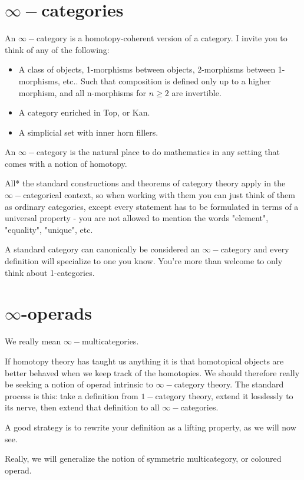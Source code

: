 \section{$\infty-$categories}
An $\infty-$category is a homotopy-coherent version of a category. I invite you to think of any of the following:
\begin{itemize}
    \item A class of objects, 1-morphisms between objects, 2-morphisms between 1-morphisms, etc.. Such that composition is defined only up to a higher morphism, and all n-morphisms for $n\geq 2$ are invertible.
    \item A category enriched in Top, or Kan.
    \item A simplicial set with inner horn fillers.
\end{itemize}

An $\infty-$category is the natural place to do mathematics in any setting that comes with a notion of homotopy.

All* the standard constructions and theorems of category theory apply in the $\infty-$categorical context, so when working with them you can just think of them as ordinary categories, except every statement has to be formulated in terms of a universal property - you are not allowed to mention the words "element", "equality", "unique", etc.

A standard category can canonically be considered an $\infty-$category and every definition will specialize to one you know. You're more than welcome to only think about 1-categories.


\section{$\infty$-operads}
We really mean $\infty-$multicategories.

If homotopy theory has taught us anything it is that homotopical objects are better behaved when we keep track of the homotopies. We should therefore really be seeking a notion of operad intrinsic to $\infty-$category theory. The standard process is this: take a definition from $1-$category theory, extend it losslessly to its nerve, then extend that definition to all $\infty-$categories.

A good strategy is to rewrite your definition as a lifting property, as we will now see.

Really, we will generalize the notion of symmetric multicategory, or coloured operad.
